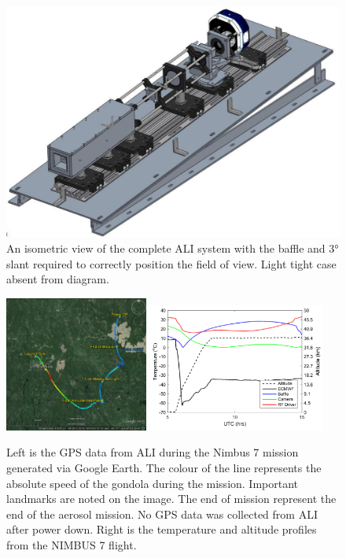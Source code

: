 \documentclass[12pt]{article}
\begin{document}
\begin{figure}
        \centering
        \includegraphics[width=1.0\textwidth]{./Images/3-3-AliCompleteDesign.pdf}
        \caption{An isometric view of the complete ALI system with the baffle and 3\si{\degree} slant required to correctly position the field of view. Light tight case absent from diagram.}
        \label{fig:3.3:aliSystemDiagram}
\end{figure}

\clearpage

\begin{figure}
    \includegraphics[width=0.42\textwidth]{./Images/5-1-AliGpsDataGoogleMaps.jpg}
    \includegraphics[width=0.52\textwidth]{./Images/5-1-FlightTemperatures.pdf}
    \caption{Left is the GPS data from ALI during the Nimbus 7 mission generated via Google Earth. The colour of the line represents the absolute speed of the gondola during the mission. Important landmarks are noted on the image. The end of mission represent the end of the aerosol mission. No GPS data was collected from ALI after power down. Right is the temperature and altitude profiles from the NIMBUS 7 flight.}
    \label{fig:5.1:nimbus7FlightPath}
\end{figure}
\end{document}

